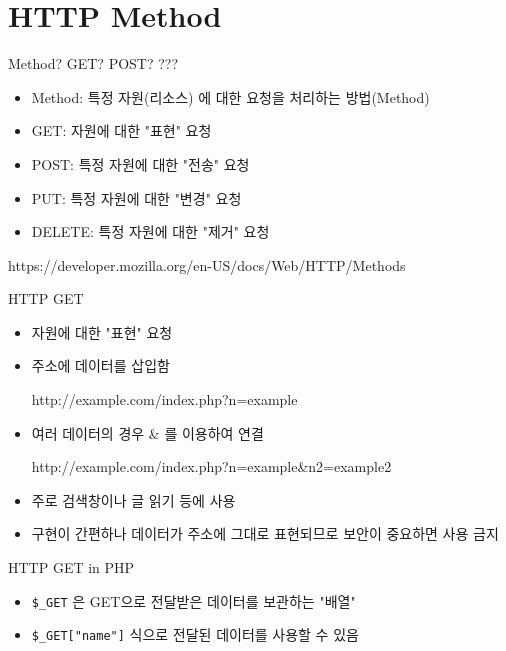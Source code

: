 \documentclass{beamer}
\begin{document}
\section{HTTP Method}

    \begin{frame}{Method? GET? POST? ???}
        \begin{itemize}
            \item Method: 특정 자원(리소스) 에 대한 요청을 처리하는 방법(Method)
            \item GET: 자원에 대한 "표현" 요청
            \item POST: 특정 자원에 대한 "전송" 요청
            \item PUT: 특정 자원에 대한 "변경" 요청
            \item DELETE: 특정 자원에 대한 "제거" 요청
        \end{itemize}
        \vspace{1cm}
        \tiny{https://developer.mozilla.org/en-US/docs/Web/HTTP/Methods}
    \end{frame}

    \begin{frame}{HTTP GET}
        \begin{itemize}
            \item 자원에 대한 "표현" 요청
            \item 주소에 데이터를 삽입함
            
            http://example.com/index.php?n=example
            \item 여러 데이터의 경우 \& 를 이용하여 연결
            
            http://example.com/index.php?n=example\&n2=example2
            \item 주로 검색창이나 글 읽기 등에 사용
            \item 구현이 간편하나 데이터가 주소에 그대로 표현되므로 보안이 중요하면 사용 금지
        \end{itemize}
    \end{frame}

    \begin{frame}{HTTP GET in PHP}
        \begin{itemize}
            \item \texttt{\$\_GET} 은 GET으로 전달받은 데이터를 보관하는 "배열"
            \item \texttt{\$\_GET["name"]} 식으로 전달된 데이터를 사용할 수 있음
        \end{itemize}
    \end{frame}
\end{document}
